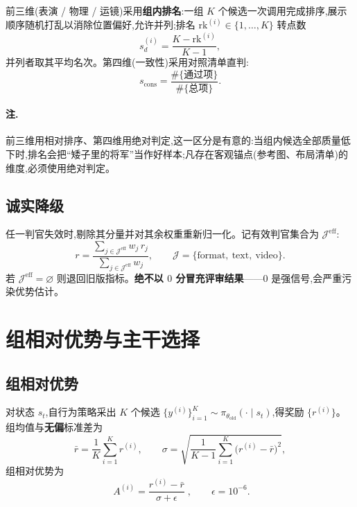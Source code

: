 \documentclass[UTF8, 11pt]{ctexart}
\begin{document}
前三维(表演 / 物理 / 运镜)采用\textbf{组内排名}:一组 $K$ 个候选一次调用完成排序,展示顺序随机打乱以消除位置偏好,允许并列;排名 $\mathrm{rk}^{(i)}\in\{1,\dots,K\}$ 转点数
\begin{equation}
s^{(i)}_d=\frac{K-\mathrm{rk}^{(i)}}{K-1},
\label{eq:rank2point}
\end{equation}
并列者取其平均名次。第四维(一致性)采用对照清单直判:
\begin{equation}
s_{\text{cons}}=\frac{\#\{\text{通过项}\}}{\#\{\text{总项}\}} .
\label{eq:cons}
\end{equation}

\paragraph{注.} 前三维用相对排序、第四维用绝对判定,这一区分是有意的:当组内候选全部质量低下时,排名会把“矮子里的将军”当作好样本;凡存在客观锚点(参考图、布局清单)的维度,必须使用绝对判定。

\subsection{诚实降级}

任一判官失效时,剔除其分量并对其余权重重新归一化。记有效判官集合为 $\mathcal{J}^{\text{eff}}$:
\begin{equation}
r=\frac{\displaystyle\sum_{j\in\mathcal{J}^{\text{eff}}} w_j\, r_j}
        {\displaystyle\sum_{j\in\mathcal{J}^{\text{eff}}} w_j},
\qquad
\mathcal{J}=\{\text{format},\ \text{text},\ \text{video}\}.
\label{eq:degrade}
\end{equation}
若 $\mathcal{J}^{\text{eff}}=\varnothing$ 则退回旧版指标。\textbf{绝不以 $0$ 分冒充评审结果}——$0$ 是强信号,会严重污染优势估计。

\section{组相对优势与主干选择}

\subsection{组相对优势}

对状态 $s_t$,自行为策略采出 $K$ 个候选 $\{y^{(i)}\}_{i=1}^{K}\sim\pi_{\theta_{\text{old}}}(\cdot\mid s_t)$,得奖励 $\{r^{(i)}\}$。组均值与\textbf{无偏}标准差为
\begin{equation}
\bar r=\frac{1}{K}\sum_{i=1}^{K} r^{(i)},
\qquad
\sigma=\sqrt{\frac{1}{K-1}\sum_{i=1}^{K}\bigl(r^{(i)}-\bar r\bigr)^{2}},
\label{eq:groupstat}
\end{equation}
组相对优势为
\begin{equation}
\boxed{\;
A^{(i)}=\frac{r^{(i)}-\bar r}{\sigma+\epsilon}\;},
\qquad \epsilon=10^{-6}.
\label{eq:advantage}
\end{equation}
\end{document}
